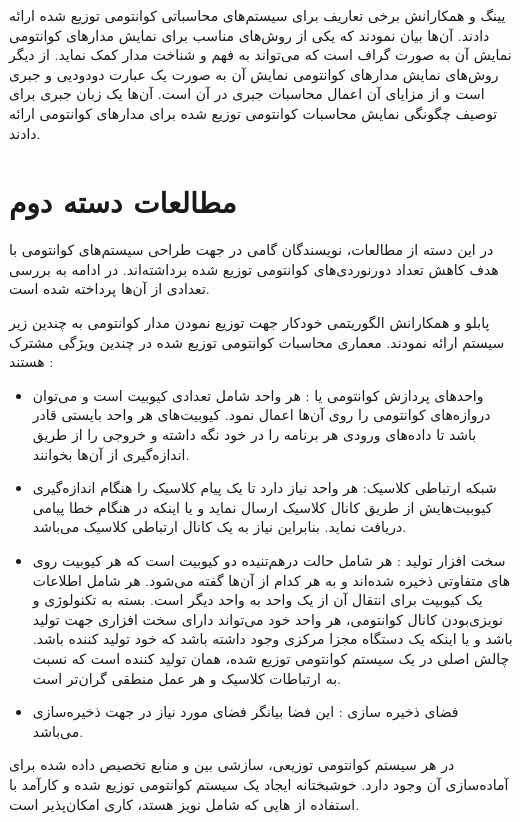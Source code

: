 یینگ و همکارانش \cite{ying2009algebraic} برخی تعاریف برای سیستم‌های محاسباتی کوانتومی توزیع شده ارائه دادند. آن‌ها بیان نمودند که یکی از روش‌های مناسب برای نمایش مدارهای کوانتومی نمایش آن به صورت گراف است که می‌تواند به فهم و شناخت مدار کمک نماید. از دیگر روش‌های نمایش مدارهای کوانتومی نمایش آن به صورت یک عبارت دودودیی و جبری است و از مزایای آن اعمال محاسبات جبری در آن است. آن‌ها یک زبان جبری برای توصیف چگونگی نمایش  محاسبات کوانتومی توزیع شده برای مدارهای کوانتومی ارائه دادند.
\section{مطالعات دسته دوم}
در این دسته از مطالعات، نویسندگان گامی در جهت طراحی سیستم‌های کوانتومی با هدف کاهش تعداد دورنوردی‌های کوانتومی توزیع شده برداشته‌اند. در ادامه به بررسی تعدادی از آن‌ها پرداخته شده است.

 پابلو و همکارانش \cite{Pablo} الگوریتمی خودکار جهت توزیع نمودن مدار کوانتومی به چندین زیر سیستم ارائه نمودند. معماری محاسبات کوانتومی توزیع شده در چندین ویژگی مشترک هستند \cite{van2016path}:
\begin{itemize}
\item
واحدهای پردازش کوانتومی یا : هر واحد شامل تعدادی کیوبیت است و می‌توان دروازه‌های کوانتومی را روی آن‌ها اعمال نمود. کیوبیت‌های هر واحد بایستی قادر باشد تا داده‌های ورودی هر برنامه را در خود نگه داشته و خروجی را از طریق اندازه‌گیری از آن‌ها بخوانند.

\item
شبکه ارتباطی کلاسیک: هر واحد  نیاز دارد تا یک پیام کلاسیک را هنگام اندازه‌گیری کیوبیت‌هایش از طریق کانال کلاسیک ارسال نماید و یا اینکه در هنگام خطا پیامی دریافت نماید. بنابراین نیاز به یک کانال ارتباطی کلاسیک می‌باشد.
\item
سخت افزار تولید : هر  شامل حالت درهم‌تنیده دو کیوبیت است که هر کیوبیت روی  های متفاوتی ذخیره شده‌اند و به هر کدام از  آن‌ها  گفته می‌شود. هر  شامل اطلاعات یک کیوبیت برای انتقال آن از یک واحد به واحد دیگر است. بسته به تکنولوژی و  نویزی‌بودن کانال کوانتومی، هر واحد خود می‌تواند دارای سخت افزاری جهت تولید  باشد و یا اینکه یک دستگاه مجزا مرکزی وجود داشته باشد که خود تولید کننده  باشد\cite{bennett1996mixed}. چالش اصلی در یک سیستم کوانتومی توزیع شده، همان تولید کننده  است که نسبت به ارتباطات کلاسیک  و هر عمل منطقی گران‌تر است.
\item
فضای ذخیره سازی : این فضا بیانگر فضای مورد نیاز در جهت ذخیره‌سازی  می‌باشد.
\end{itemize}
در هر سیستم کوانتومی توزیعی، سازشی بین   و منابع تخصیص داده شده برای آماده‌سازی آن وجود دارد\cite{bennett1996purification}. خوشبختانه ایجاد یک سیستم کوانتومی توزیع شده و کارآمد با استفاده از  هایی که شامل نویز هستد، کاری امکان‌پذیر است\cite{Cirac1999}.

